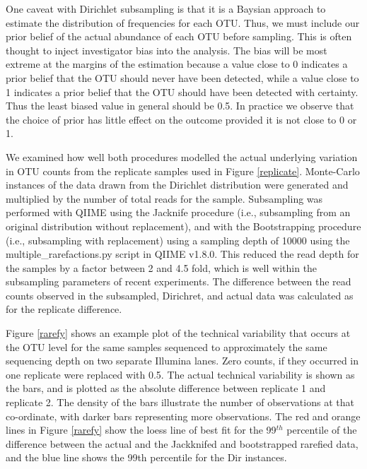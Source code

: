 \documentclass[11pt]{article}\usepackage[]{graphicx}\usepackage[]{color}
\begin{document}
One caveat with Dirichlet subsampling is that it is a Baysian approach to estimate the distribution of frequencies for each OTU. Thus, we must include our prior belief of the actual abundance of each OTU before sampling. This is often thought to inject investigator bias into the analysis. The bias will be most extreme at the margins of the estimation because a value close to 0 indicates a prior belief that the OTU should never have been detected, while a value close to 1 indicates a prior belief that the OTU should have been detected with certainty. Thus the least biased value in general should be 0.5\cite{Jaynes:2003}. In practice we observe that the choice of prior has little effect on the outcome provided it is not close to 0 or 1.

We examined how well both procedures modelled the actual underlying variation in OTU counts from the replicate samples used in Figure \ref{replicate}. Monte-Carlo instances of the data drawn from the Dirichlet distribution were generated and multiplied by the number of total reads for the sample. Subsampling was  performed with QIIME\cite{Caporaso:2010a} using the Jacknife procedure (i.e., subsampling from an original distribution without replacement\cite{Efron:1981}), and with the Bootstrapping procedure\cite{Efron:1981} (i.e., subsampling with replacement) using a sampling depth of 10000 using the multiple\_rarefactions.py script in QIIME v1.8.0. This reduced the read depth for the samples by a factor between 2 and 4.5 fold, which is well within the subsampling parameters of recent experiments. The difference between the read counts observed in the subsampled, Dirichret, and actual data was calculated as for the replicate difference. 


Figure \ref{rarefy} shows an example  plot of the technical variability that occurs at the OTU level for the same samples sequenced to approximately the same sequencing depth on two separate Illumina lanes. Zero counts, if they occurred in one replicate were replaced with 0.5\cite{fernandes:2013,martin:2003}. The actual technical variability is shown as the bars, and is plotted as the absolute difference between replicate 1 and replicate 2. The density of the bars illustrate the number of observations at that co-ordinate, with darker bars representing more observations. The red and orange lines in Figure \ref{rarefy} show the loess line of best fit for the 99$^{th}$ percentile of the difference between the actual and the Jackknifed and bootstrapped rarefied data, and the blue line shows the 99th percentile for the Dir instances. 
\end{document}
